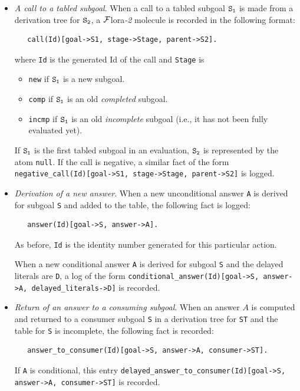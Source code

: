 \documentclass[11pt]{article}
\newcommand{\FLORA}{{\mbox{\sc ${\cal F}${lora}\rm\emph{-2}}}\xspace}
\begin{document}
\begin{itemize}
\item \emph{A call to a tabled subgoal}. When a call to a tabled subgoal $\tt S_1$ is
  made from a derivation tree for $\tt S_2$, a \FLORA molecule is recorded in
  the following format:
\begin{verbatim}
   call(Id)[goal->S1, stage->Stage, parent->S2].
\end{verbatim}
  where {\tt Id} is the generated Id of the call and {\tt Stage} is
  \begin{itemize}
  \item {\tt new} if $\tt S_1$ is a new subgoal.
  \item {\tt comp} if $\tt S_1$ is an old \emph{completed} subgoal.
  \item {\tt incmp} if $\tt S_1$ is an old \emph{incomplete} subgoal (i.e., it
    has not been fully evaluated yet).
  \end{itemize}

  If $\tt S_1$ is the first tabled subgoal in an evaluation, $\tt S_2$ is
  represented by the atom {\tt null}.
  If the call is negative, a similar fact of the form
  {\tt negative\_call(Id)[goal->S1, stage->Stage, parent->S2]} is logged. 
  
\item \emph{Derivation of a new answer}. When a new unconditional
  answer {\tt A} is derived for  
  subgoal \texttt{S}  and added to the table, the following fact is logged:
\begin{verbatim}
   answer(Id)[goal->S, answer->A].
\end{verbatim}
  As before, {\tt Id} is the identity number generated for this particular
  action. 

  When a new conditional answer {\tt A} is derived for subgoal \texttt{S}
  and the delayed literals are {\tt D}, a log of the form
  {\tt conditional\_answer(Id)[goal->S, answer->A, delayed\_literals->D]}
  is recorded. 

\item \emph{Return of an answer to a consuming subgoal}. When an answer $A$ is
  computed and
  returned to a consumer subgoal \texttt{S} in a derivation tree for
  \texttt{ST}  and the
  table for \texttt{S}
  is incomplete, the following fact is recorded:
\begin{verbatim}  
   answer_to_consumer(Id)[goal->S, answer->A, consumer->ST].
\end{verbatim}  
  If \texttt{A} is conditional, this entry
  {\tt delayed\_answer\_to\_consumer(Id)[goal->S, answer->A, consumer->ST]} 
  is recorded. 


\end{itemize}
\end{document}
